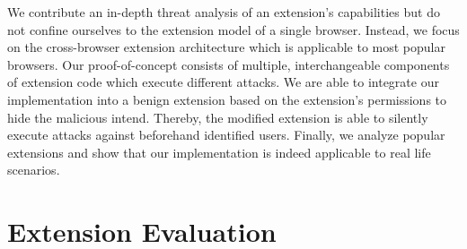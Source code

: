 	We contribute an in-depth threat analysis of an extension's capabilities but do not confine ourselves to the extension model of a single browser. Instead, we focus on the cross-browser extension architecture which is applicable to most popular browsers. Our proof-of-concept consists of multiple, interchangeable components of extension code which execute different attacks. We are able to integrate our implementation into a benign extension based on the extension's permissions to hide the malicious intend. Thereby, the modified extension is able to silently execute attacks against beforehand identified users. Finally, we analyze popular extensions and show that our implementation is indeed applicable to real life scenarios.
	
\section{Extension Evaluation} 
	
